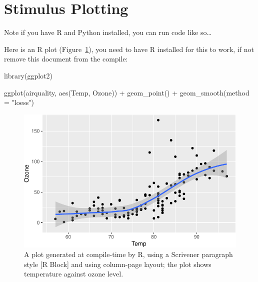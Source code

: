 \documentclass[
  12pt,
  a4paper,
  oneside]{scrbook}
\newenvironment{Shaded}{\begin{snugshade}}{\end{snugshade}}
\newcommand{\AttributeTok}[1]{\textcolor[rgb]{0.40,0.45,0.13}{#1}}
\newcommand{\FunctionTok}[1]{\textcolor[rgb]{0.28,0.35,0.67}{#1}}
\newcommand{\NormalTok}[1]{\textcolor[rgb]{0.00,0.23,0.31}{#1}}
\newcommand{\SpecialCharTok}[1]{\textcolor[rgb]{0.37,0.37,0.37}{#1}}
\newcommand{\StringTok}[1]{\textcolor[rgb]{0.13,0.47,0.30}{#1}}
\begin{document}
\hypertarget{stimulus-plotting}{%
\section{Stimulus Plotting}\label{stimulus-plotting}}

\protect\hypertarget{scriv7}{}{}

Note if you have R and Python installed, you can run code like
so\ldots{}

Here is an R plot
(\protect\hypertarget{cite_18}{}{\label{cite_18}Figure~\ref{fig-airquality}}),
you need to have R installed for this to work, if not remove this
document from the compile:

\begin{Shaded}
\begin{Highlighting}[numbers=left,,]
\FunctionTok{library}\NormalTok{(ggplot2)}

\FunctionTok{ggplot}\NormalTok{(airquality, }\FunctionTok{aes}\NormalTok{(Temp, Ozone)) }\SpecialCharTok{+} 
  \FunctionTok{geom\_point}\NormalTok{() }\SpecialCharTok{+} 
  \FunctionTok{geom\_smooth}\NormalTok{(}\AttributeTok{method =} \StringTok{"loess"}\NormalTok{)}
\end{Highlighting}
\end{Shaded}

\begin{figure}[H]

{\centering \includegraphics{Quarto_files/figure-pdf/fig-airquality-1.pdf}

}

\caption{\label{fig-airquality}A plot generated at compile-time by R,
using a Scrivener paragraph style {[}R Block{]} and using column-page
layout; the plot shows temperature against ozone level.}

\end{figure}
\end{document}
